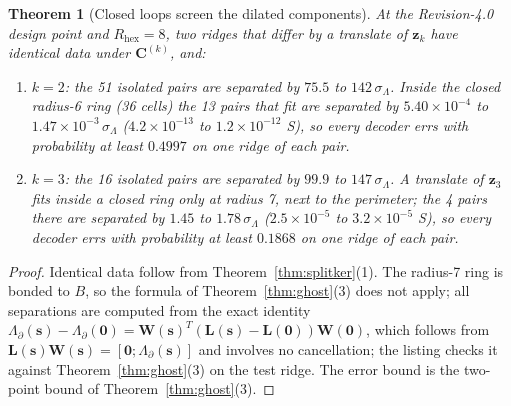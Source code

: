 \documentclass[11pt,a4paper]{article}
\newtheorem{theorem}{Theorem}[section]
\theoremstyle{definition}
\theoremstyle{remark}
\begin{document}
\begin{theorem}[Closed loops screen the dilated components]\label{thm:splitscreen}
At the Revision-4.0 design point and $R_{\text{hex}} = 8$, two ridges that differ by a translate of $\mathbf{z}_k$ have identical data under $\mathbf{C}^{(k)}$, and:
\begin{enumerate}
\item $k = 2$: the 51 isolated pairs are separated by $75.5$ to $142\,\sigma_\Lambda$. Inside the closed radius-6 ring (36 cells) the 13 pairs that fit are separated by $5.40\times10^{-4}$ to $1.47\times10^{-3}\,\sigma_\Lambda$ ($4.2\times10^{-13}$ to $1.2\times10^{-12}$ S), so every decoder errs with probability at least $0.4997$ on one ridge of each pair.
\item $k = 3$: the 16 isolated pairs are separated by $99.9$ to $147\,\sigma_\Lambda$. A translate of $\mathbf{z}_3$ fits inside a closed ring only at radius 7, next to the perimeter; the 4 pairs there are separated by $1.45$ to $1.78\,\sigma_\Lambda$ ($2.5\times10^{-5}$ to $3.2\times10^{-5}$ S), so every decoder errs with probability at least $0.1868$ on one ridge of each pair.
\end{enumerate}
\end{theorem}
\begin{proof}
Identical data follow from Theorem~\ref{thm:splitker}(1). The radius-7 ring is bonded to $B$, so the formula of Theorem~\ref{thm:ghost}(3) does not apply; all separations are computed from the exact identity $\Lambda_\partial(\mathbf{s})-\Lambda_\partial(\mathbf{0}) = \mathbf{W}(\mathbf{s})^T(\mathbf{L}(\mathbf{s})-\mathbf{L}(\mathbf{0}))\mathbf{W}(\mathbf{0})$, which follows from $\mathbf{L}(\mathbf{s})\mathbf{W}(\mathbf{s}) = [\mathbf{0};\Lambda_\partial(\mathbf{s})]$ and involves no cancellation; the listing checks it against Theorem~\ref{thm:ghost}(3) on the test ridge. The error bound is the two-point bound of Theorem~\ref{thm:ghost}(3).
\end{proof}
\end{document}
